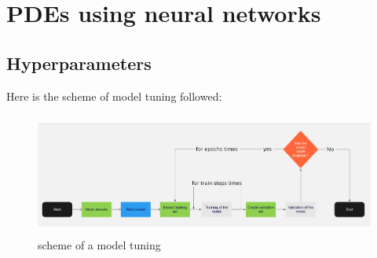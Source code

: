 \chapter{PDEs using neural networks} 
\label{chapter3}
\section{Hyperparameters}
Here is the scheme of model tuning followed:
\begin{figure}[h]
    \includegraphics[width=13cm, height=4cm]{images/tuning_model.png}
    \centering
    \caption{scheme of a model tuning}
\end{figure}

